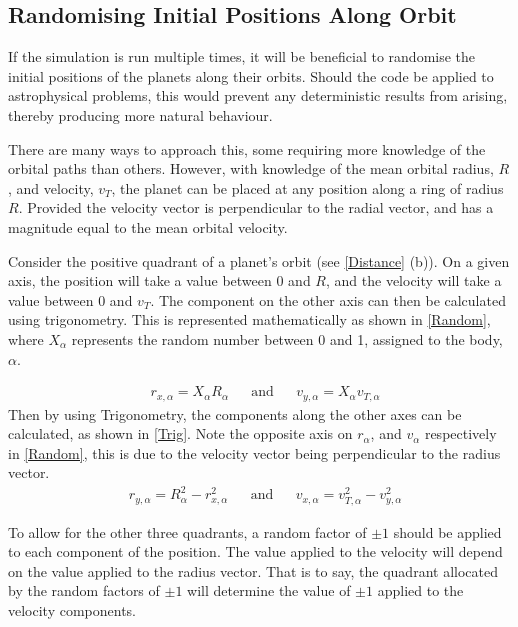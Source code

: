 \documentclass[a4paper,10pt]{article}
\begin{document}
\subsection{Randomising Initial Positions Along Orbit}

If the simulation is run multiple times, it will be beneficial to randomise the initial positions of the planets along their orbits. Should the code be applied to astrophysical problems, this would prevent any deterministic results from arising, thereby producing more natural behaviour. 

There are many ways to approach this, some requiring more knowledge of the orbital paths than others. However, with knowledge of the mean orbital radius, $R$, and velocity, $v_T$, the planet can be placed at any position along a ring of radius $R$. Provided the velocity vector is perpendicular to the radial vector, and has a magnitude equal to the mean orbital velocity. 

Consider the positive quadrant of a planet's orbit (see \cref{Distance} (b)). On a given axis, the position will take a value between 0 and $R$, and the velocity will take a value between 0 and $v_T$. The component on the other axis can then be calculated using trigonometry. This is represented mathematically as shown in \cref{Random}, where $X_{\alpha}$ represents the random number between 0 and 1, assigned to the body, $\alpha$.

\begin{align}\label{Random}
&r_{x,\alpha} = X_{\alpha} R_{\alpha}&
&\text{and}&
&v_{y,\alpha} = X_{\alpha} v_{T,\alpha}
\end{align}
Then by using Trigonometry, the components along the other axes can be calculated, as shown in \cref{Trig}. Note the opposite axis on $r_{\alpha}$, and $v_{\alpha}$ respectively in \cref{Random}, this is due to the velocity vector being perpendicular to the radius vector.
\begin{align}\label{Trig}
&r_{y,\alpha} = R_{\alpha}^2 - r_{x,\alpha}^2&
&\text{and}&
&v_{x,\alpha} = v_{T,\alpha}^2 - v_{y,\alpha}^2
\end{align}

To allow for the other three quadrants, a random factor of $\pm 1$ should be applied to each component of the position. The value applied to the velocity will depend on the value applied to the radius vector. That is to say, the quadrant allocated by the random factors of $\pm1$ will determine the value of $\pm1$ applied to the velocity components. 
\end{document}
